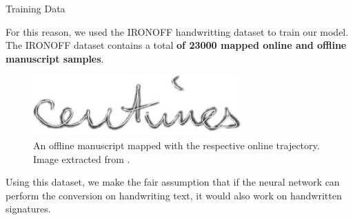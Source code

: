 \documentclass{beamer}
\begin{document}
\begin{frame}{Training Data}
%
%


For this reason, we used the IRONOFF handwritting dataset to train our model. The IRONOFF dataset contains a total\textbf{ of 23000 mapped online and offline manuscript samples}.
\begin{figure}[!htb]

\includegraphics{ironoff-mapped}
\caption{An offline manuscript mapped with the respective online trajectory. Image extracted from \cite{viard1999ireste}.}
\label{fig:ironoff-mapped}
\end{figure}

 Using this dataset, we make the fair assumption that if the neural network can perform the conversion on handwriting text, it would also work on handwritten signatures.


\end{frame}
\end{document}
